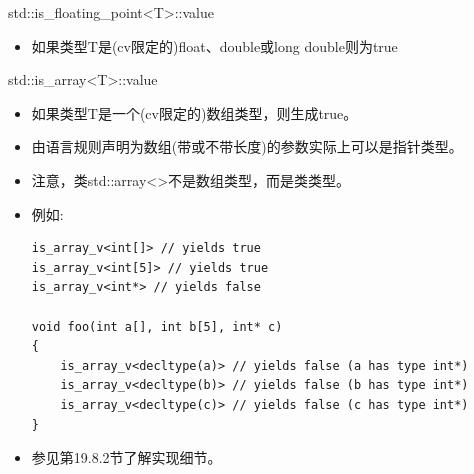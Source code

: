 std::is\_floating\_point<T>::value

\begin{itemize}
\item 
如果类型T是(cv限定的)float、double或long double则为true
\end{itemize}

std::is\_array<T>::value

\begin{itemize}
\item 
如果类型T是一个(cv限定的)数组类型，则生成true。

\item 
由语言规则声明为数组(带或不带长度)的参数实际上可以是指针类型。

\item 
注意，类std::array<>不是数组类型，而是类类型。

\item 
例如:

\begin{lstlisting}[style=styleCXX]
is_array_v<int[]> // yields true
is_array_v<int[5]> // yields true
is_array_v<int*> // yields false

void foo(int a[], int b[5], int* c)
{
	is_array_v<decltype(a)> // yields false (a has type int*)
	is_array_v<decltype(b)> // yields false (b has type int*)
	is_array_v<decltype(c)> // yields false (c has type int*)
}
\end{lstlisting}

\item 
参见第19.8.2节了解实现细节。

\end{itemize}

